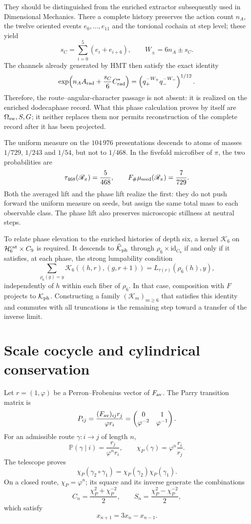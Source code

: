 They should be distinguished from the enriched extractor subsequently used in
Dimensional Mechanics. There a complete history preserves the action count
\(n_A\), the twelve oriented events \(e_0,\ldots,e_{11}\) and the torsional
cochain at step level; these yield
\[
 s_C=\sum_{i=0}^{5}(e_i+e_{i+6}),
 \qquad
 W_\pm=6n_A\pm s_C.
\]
The channels already generated by HMT then satisfy the exact identity
\[
 \exp\!\left(n_AA_{\rm rad}+\frac{s_C}{6}C^\ast_{\rm rad}\right)
 =\left(q_+^{-W_+}q_-^{-W_-}\right)^{1/12}.
\]
Therefore, the route--angular-character passage is not absent: it is realized on
the enriched dodecaphase record. What this phase calculation proves by itself
are \(\Omega_{\rm sw},S,G\); it neither replaces them nor permits reconstruction of the
complete record after it has been projected.

The uniform measure on the \(104\,976\) presentations descends to atoms
of masses \(1/729\), \(1/243\) and \(1/54\), but not to \(1/468\). In the
fivefold microfiber of \(\pi\), the two probabilities are
\[
 \tau_{468}(\mathscr R_\pi)=\frac5{468},
 \qquad
 F_\#\mu_{\rm seed}(\mathscr R_\pi)=\frac7{729}.
\]
Both the averaged lift and the phase lift realize the first: they do not
push forward the uniform measure on seeds, but assign the same total
mass to each observable class. The phase lift also preserves
microscopic stillness at neutral steps.

To relate phase elevation to the enriched histories of
depth six, a kernel \(\mathcal K_6\) on
\(\mathcal H_6^{\rm cat}\times C_9\) is required. It descends to
\(\widehat{\mathcal K}_{\rm ph}\) through
\(\rho_6\times\mathrm{id}_{C_9}\) if and only if it satisfies, at each phase, the
strong lumpability condition
\[
 \sum_{\rho_6(g)=y}\mathcal K_6((h,r),(g,r+1))
 =L_{\tau(r)}(\rho_6(h),y),
\]
independently of \(h\) within each fiber of \(\rho_6\). In that case,
composition with \(F\) projects to \(\mathcal K_{\rm ph}\). Constructing
a family \((\mathcal K_m)_{m\geq6}\) that satisfies this identity and
commutes with all truncations is the remaining step toward a
transfer of the inverse limit.

\section{Scale cocycle and cylindrical conservation}
\label{sec:cociclo-parry-escala}

Let \(r=(1,\varphi)\) be a Perron--Frobenius vector of
\(F_{\rm av}\). The Parry transition matrix is
\[
P_{ij}=\frac{(F_{\rm av})_{ij}r_j}{\varphi r_i}
=
\begin{pmatrix}
0&1\\
\varphi^{-2}&\varphi^{-1}
\end{pmatrix}.
\]
For an admissible route \(\gamma:i\to j\) of length \(n\),
\[
\mathbb P(\gamma\mid i)=\frac{r_j}{\varphi^nr_i},
\qquad
\boxed{\chi_P(\gamma)=\varphi^n\frac{r_i}{r_j}.}
\]
The telescope proves
\[
\chi_P(\gamma_2\circ\gamma_1)
=\chi_P(\gamma_2)\chi_P(\gamma_1).
\]
On a closed route, \(\chi_P=\varphi^n\); its square and its inverse
generate the combinations
\[
C_n=\frac{\chi_P^2+\chi_P^{-2}}2,\qquad
S_n=\frac{\chi_P^2-\chi_P^{-2}}2,
\]
which satisfy
\[
x_{n+1}=3x_n-x_{n-1}.
\]

